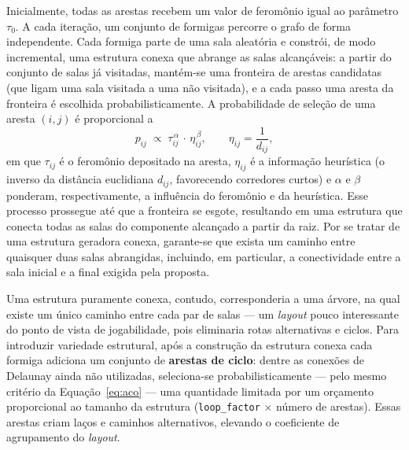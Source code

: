 \documentclass[12pt]{article}
\begin{document}
Inicialmente, todas as arestas recebem um valor de feromônio igual ao parâmetro $\tau_0$. A cada iteração, um conjunto de formigas
percorre o grafo de forma independente. Cada formiga parte de uma sala aleatória e constrói, de modo incremental, uma estrutura
conexa que abrange as salas alcançáveis: a partir do conjunto de salas já visitadas, mantém-se uma fronteira de arestas candidatas
(que ligam uma sala visitada a uma não visitada), e a cada passo uma aresta da fronteira é escolhida probabilisticamente. A
probabilidade de seleção de uma aresta $(i,j)$ é proporcional a
\begin{equation}
    p_{ij} \;\propto\; \tau_{ij}^{\,\alpha}\,\cdot\,\eta_{ij}^{\,\beta},
    \qquad \eta_{ij} = \frac{1}{d_{ij}},
    \label{eq:aco}
\end{equation}
em que $\tau_{ij}$ é o feromônio depositado na aresta, $\eta_{ij}$ é a informação heurística (o inverso da distância euclidiana
$d_{ij}$, favorecendo corredores curtos) e $\alpha$ e $\beta$ ponderam, respectivamente, a influência do feromônio e da heurística.
Esse processo prossegue até que a fronteira se esgote, resultando em uma estrutura que conecta todas as salas do componente
alcançado a partir da raiz. Por se tratar de uma estrutura geradora conexa, garante-se que exista um caminho entre quaisquer duas
salas abrangidas, incluindo, em particular, a conectividade entre a sala inicial e a final exigida pela proposta.
 
Uma estrutura puramente conexa, contudo, corresponderia a uma árvore, na qual existe um único caminho entre cada par de salas —
um \textit{layout} pouco interessante do ponto de vista de jogabilidade, pois eliminaria rotas alternativas e ciclos. Para
introduzir variedade estrutural, após a construção da estrutura conexa cada formiga adiciona um conjunto de \textbf{arestas de
ciclo}: dentre as conexões de Delaunay ainda não utilizadas, seleciona-se probabilisticamente — pelo mesmo critério da
Equação~\ref{eq:aco} — uma quantidade limitada por um orçamento proporcional ao tamanho da estrutura
(\texttt{loop\_factor} $\times$ número de arestas). Essas arestas criam laços e caminhos alternativos, elevando o coeficiente de
agrupamento do \textit{layout}.
 
\end{document}
